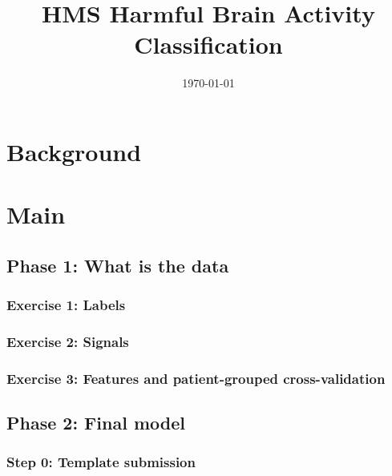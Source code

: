 \documentclass[11pt,a4paper]{article}
\title{HMS Harmful Brain Activity Classification}
\author{}
\date{\today}
\begin{document}
\maketitle

\section{Background}



\section{Main}

\subsection{Phase 1: What is the data}

\subsubsection{Exercise 1: Labels}


\subsubsection{Exercise 2: Signals}


\subsubsection{Exercise 3: Features and patient-grouped cross-validation}


\subsection{Phase 2: Final model}

\subsubsection{Step 0: Template submission}
\end{document}
